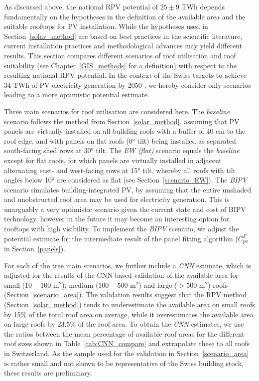 As discussed above, the national RPV potential of $25 \pm 9$ TWh depends fundamentally on the hypotheses in the definition of the available area and the suitable rooftops for PV installation. 
While the hypotheses used in Section~\ref{solar_method} are based on best practices in the scientific literature, current installation practices and methodological advances may yield different results. 
This section compares different scenarios of roof utilisation and roof suitability (see Chapter~\ref{GIS_methods} for a definition) with respect to the resulting national RPV potential. 
In the context of the Swiss targets to achieve 34 TWh of PV electricity generation by 2050 \cite{bfe_energieperspektiven_2020}, we hereby consider only scenarios leading to a more optimistic potential estimate.

Three main scenarios for roof utilisation are considered here. 
The \textit{baseline} scenario follows the method from Section~\ref{solar_method}, assuming that PV panels are virtually installed on all building roofs with a buffer of 40 cm to the roof edge, and with panels on flat roofs (0° tilt) being installed as separated south-facing shed rows at 30° tilt.
The \textit{EW (flat)} scenario equals the \textit{baseline} except for flat roofs, for which panels are virtually installed in adjacent alternating east- and west-facing rows at 15° tilt, whereby all roofs with tilt angles below 10° are considered as flat (see Section~\ref{scenario_EW}).
The \textit{BIPV} scenario simulates building-integrated PV, by assuming that the entire unshaded and unobstructed roof area may be used for electricity generation. This is unarguably a very optimistic scenario given the current state and cost of BIPV technology, however in the future it may become an interesting option for rooftops with high visibility. To implement the \textit{BIPV} scenario, we adjust the potential estimate for the intermediate result of the panel fitting algorithm ($C_{pv}^F$ in Section~\ref{panels}).

For each of the tree main scenarios, we further include a \textit{CNN} estimate, which is adjusted for the results of the CNN-based validation of the available area for small ($10 - 100$ m$^2$), medium ($100 - 500$ m$^2$) and large ($> 500$ m$^2$) roofs (Section~\ref{scenario_area}).
The validation results suggest that the RPV method (Section~\ref{solar_method}) tends to underestimate the available area on small roofs by 15\% of the total roof area on average, while it overestimates the available area on large roofs by 23.5\% of the roof area. 
To obtain the \textit{CNN} estimates, we use the ratios between the mean percentage of available roof areas for the different roof sizes shown in Table~\ref{tab:CNN_compare} and extrapolate these to all roofs in Switzerland.
As the sample used for the validation in  Section~\ref{scenario_area} is rather small and not shown to be representative of the Swiss building stock, these results are preliminary.

